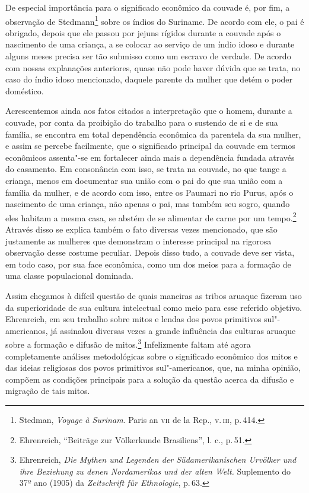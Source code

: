 De especial importância para o significado econômico da couvade é, por
fim, a observação de Stedmann\footnote{Stedman, \textit{Voyage à Surinam}.
  Paris an \textsc{vii} de la Rep., v.\,\textsc{iii}, p.\,414.} sobre os índios do
Suriname. De acordo com ele, o pai é obrigado, depois que ele passou por
jejuns rígidos durante a couvade após o nascimento de uma criança, a se
colocar ao serviço de um índio idoso e durante alguns meses precisa ser
tão submisso como um escravo de verdade. De acordo com nossas
explanações anteriores, quase não pode haver dúvida que se trata, no
caso do índio idoso mencionado, daquele parente da mulher que detém o
poder doméstico.

Acrescentemos ainda aos fatos citados a interpretação que o homem,
durante a couvade, por conta da proibição do trabalho para o sustendo
de si e de sua família, se encontra em total dependência econômica da
parentela da sua mulher, e assim se percebe facilmente, que o
significado principal da couvade em termos econômicos assenta"-se em
fortalecer ainda mais a dependência fundada através do casamento. Em
consonância com isso, se trata na couvade, no que tange a criança, menos
em documentar sua união com o pai do que sua união com a família da
mulher, e de acordo com isso, entre os Paumari no rio Purus, após o
nascimento de uma criança, não apenas o pai, mas também seu sogro,
quando eles habitam a mesma casa, se abstém de se alimentar de carne por
um tempo.\footnote{Ehrenreich, ``Beiträge zur Völkerkunde Brasiliens'',
  l. c., p.\,51.} Através disso se explica também o fato diversas vezes
mencionado, que são justamente as mulheres que demonstram o interesse
principal na rigorosa observação desse costume peculiar. Depois disso
tudo, a couvade deve ser vista, em todo caso, por sua face econômica,
como um dos meios para a formação de uma classe populacional dominada.

Assim chegamos à difícil questão de quais maneiras as tribos aruaque
fizeram uso da superioridade de sua cultura intelectual como meio para
esse referido objetivo. Ehrenreich, em seu trabalho sobre mitos e lendas
dos povos primitivos sul"-americanos, já assinalou diversas vezes a
grande influência das culturas aruaque sobre a formação e difusão de
mitos.\footnote{Ehrenreich, \textit{Die Mythen und Legenden der
  Südamerikanischen Urvölker und ihre Beziehung zu denen Nordamerikas
  und der alten Welt.} Suplemento do 37º ano (1905) da \textit{Zeitschrift
  für Ethnologie}, p.\,63.} Infelizmente faltam até agora completamente
análises metodológicas sobre o significado econômico dos mitos e das
ideias religiosas dos povos primitivos sul"-americanos, que, na minha
opinião, compõem as condições principais para a solução da questão
acerca da difusão e migração de tais mitos.

